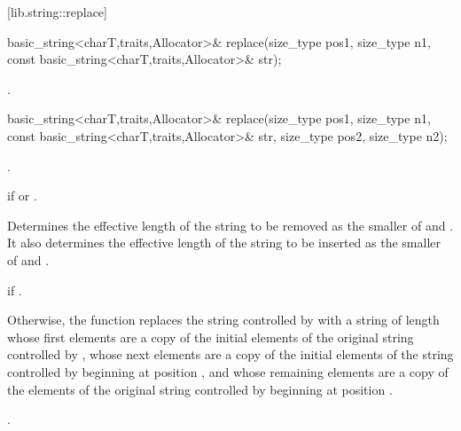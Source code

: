 [lib.string::replace]{}

%
%
\begin{itemdecl}
basic_string<charT,traits,Allocator>&
  replace(size_type pos1, size_type n1,
          const basic_string<charT,traits,Allocator>& str);
\end{itemdecl}

\begin{itemdescr}
\pnum
\returns
{}.
\end{itemdescr}

%
%
\begin{itemdecl}
basic_string<charT,traits,Allocator>&
  replace(size_type pos1, size_type n1,
          const basic_string<charT,traits,Allocator>& str,
          size_type pos2, size_type n2);
\end{itemdecl}

\begin{itemdescr}
\pnum
\requires
{}.

\pnum
\throws
{}
if
or
.

\pnum
\effects
Determines the effective length  of the string to be removed
as the smaller of  and . It also determines
the effective length  of the string to be inserted as the
smaller of  and .

\pnum
\throws
{} if .

Otherwise, the function replaces the string controlled by 
with a string of length  whose first 
elements are a copy of the initial elements of the original string controlled
by , whose next  elements are a copy of the initial
elements of the string controlled by  beginning at position
, and whose remaining elements are a copy of the elements of the
original string controlled by  beginning at position
.

\pnum
\returns
{}.
\end{itemdescr}

